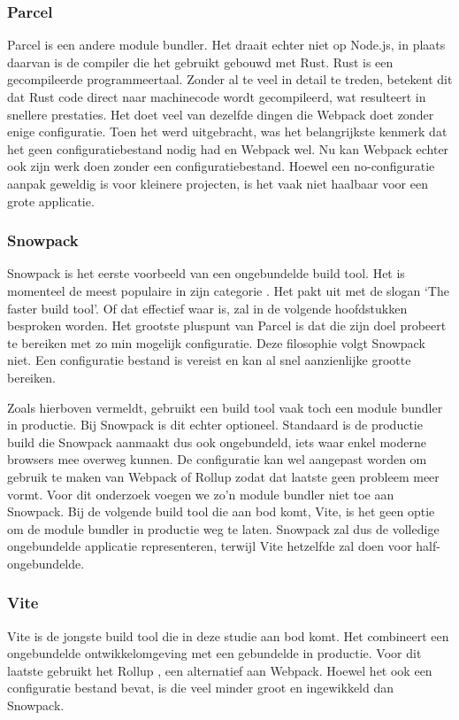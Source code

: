 \subsubsection{Parcel}

Parcel is een andere module bundler. Het draait echter niet op Node.js, in plaats daarvan is de compiler die het gebruikt gebouwd met Rust. Rust is een gecompileerde programmeertaal. Zonder al te veel in detail te treden, betekent dit dat Rust code direct naar machinecode wordt gecompileerd, wat resulteert in snellere prestaties. Het doet veel van dezelfde dingen die Webpack doet zonder enige configuratie. Toen het werd uitgebracht, was het belangrijkste kenmerk dat het geen configuratiebestand nodig had en Webpack wel. Nu kan Webpack echter ook zijn werk doen zonder een configuratiebestand. Hoewel een no-configuratie aanpak geweldig is voor kleinere projecten, is het vaak niet haalbaar voor een grote applicatie. 

\subsubsection{Snowpack}

Snowpack is het eerste voorbeeld van een ongebundelde build tool. Het is momenteel de meest populaire in zijn categorie \autocite{stateofjs-2020}. Het pakt uit met de slogan ‘The faster build tool’. Of dat effectief waar is, zal in de volgende hoofdstukken besproken worden. Het grootste pluspunt van Parcel is dat die zijn doel probeert te bereiken met zo min mogelijk configuratie. Deze filosophie volgt Snowpack niet. Een configuratie bestand is vereist en kan al snel aanzienlijke grootte bereiken.

Zoals hierboven vermeldt, gebruikt een build tool vaak toch een module bundler in productie. Bij Snowpack is dit echter optioneel. Standaard is de productie build die Snowpack aanmaakt dus ook ongebundeld, iets waar enkel moderne browsers mee overweg kunnen. De configuratie kan wel aangepast worden om gebruik te maken van Webpack of Rollup zodat dat laatste geen probleem meer vormt. Voor dit onderzoek voegen we zo’n module bundler niet toe aan Snowpack. Bij de volgende build tool die aan bod komt, Vite, is het geen optie om de module bundler in productie weg te laten. Snowpack zal dus de volledige ongebundelde applicatie representeren, terwijl Vite hetzelfde zal doen voor half-ongebundelde.

\subsubsection{Vite}
Vite is de jongste build tool die in deze studie aan bod komt. Het combineert een ongebundelde ontwikkelomgeving met een gebundelde in productie. Voor dit laatste gebruikt het Rollup \autocite{vite-no-date}, een alternatief aan Webpack. Hoewel het ook een configuratie bestand bevat, is die veel minder groot en ingewikkeld dan Snowpack. 

